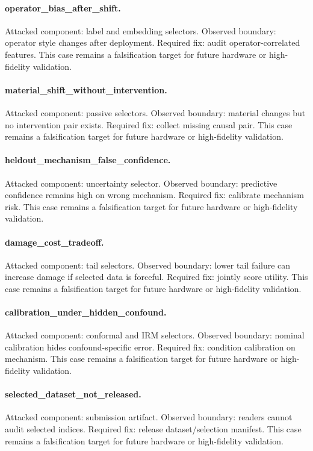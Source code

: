 \documentclass{article}
\begin{document}
\paragraph{operator\_bias\_after\_shift.} Attacked component: label and embedding selectors. Observed boundary: operator style changes after deployment. Required fix: audit operator-correlated features. This case remains a falsification target for future hardware or high-fidelity validation.
\paragraph{material\_shift\_without\_intervention.} Attacked component: passive selectors. Observed boundary: material changes but no intervention pair exists. Required fix: collect missing causal pair. This case remains a falsification target for future hardware or high-fidelity validation.
\paragraph{heldout\_mechanism\_false\_confidence.} Attacked component: uncertainty selector. Observed boundary: predictive confidence remains high on wrong mechanism. Required fix: calibrate mechanism risk. This case remains a falsification target for future hardware or high-fidelity validation.
\paragraph{damage\_cost\_tradeoff.} Attacked component: tail selectors. Observed boundary: lower tail failure can increase damage if selected data is forceful. Required fix: jointly score utility. This case remains a falsification target for future hardware or high-fidelity validation.
\paragraph{calibration\_under\_hidden\_confound.} Attacked component: conformal and IRM selectors. Observed boundary: nominal calibration hides confound-specific error. Required fix: condition calibration on mechanism. This case remains a falsification target for future hardware or high-fidelity validation.
\paragraph{selected\_dataset\_not\_released.} Attacked component: submission artifact. Observed boundary: readers cannot audit selected indices. Required fix: release dataset/selection manifest. This case remains a falsification target for future hardware or high-fidelity validation.
\end{document}
